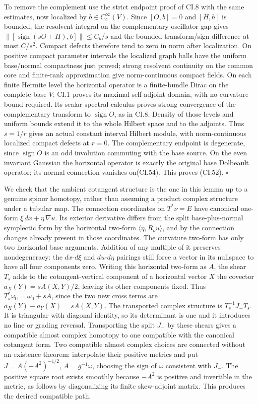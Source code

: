 \documentclass[
  11pt,
]{article}
\begin{document}
To remove the complement use the strict endpoint proof of CI.8 with the
same estimates, now localized by \(b\in C_c^\infty(V)\). Since
\([O,b]=0\) and \([H,b]\) is bounded, the resolvent integral on the
complementary oscillator gap gives
\(\|[\operatorname{sign}(sO+H),b]\|\leq C_b/s\) and the
bounded-transform/sign difference at most \(C/s^2\). Compact defects
therefore tend to zero in norm after localization. On positive compact
parameter intervals the localized graph balls have the uniform
base/normal compactness just proved; strong resolvent continuity on the
common core and finite-rank approximation give norm-continuous compact
fields. On each finite Hermite level the horizontal operator is a
finite-bundle Dirac on the complete base \(V\); CI.1 proves its maximal
self-adjoint domain, with no curvature bound required. Its scalar
spectral calculus proves strong convergence of the complementary
transform to \(\operatorname{sign}O\), as in CI.8. Density of those
levels and uniform bounds extend it to the whole Hilbert space and to
the adjoints. Thus \(s=1/r\) gives an actual constant interval Hilbert
module, with norm-continuous localized compact defects at \(r=0\). The
complementary endpoint is degenerate, since \(\operatorname{sign}O\) is
an odd involution commuting with the base source. On the even invariant
Gaussian the horizontal operator is exactly the original base Dolbeault
operator; its normal connection vanishes on(CI.54). This proves (CI.52).
\(\square\)

We check that the ambient cotangent structure is the one in this lemma
up to a genuine spinor homotopy, rather than assuming a product complex
structure under a tubular map. The connection coordinates on
\(T^*\nu=E\) have canonical one-form \(\xi\,dx+\eta\,\nabla u\). Its
exterior derivative differs from the split base-plus-normal symplectic
form by the horizontal two-form \(\langle\eta,R_\nu u\rangle\), and by
the connection changes already present in those coordinates. The
curvature two-form has only two horizontal base arguments. Addition of
any multiple of it preserves nondegeneracy: the \(dx\)-\(d\xi\) and
\(du\)-\(d\eta\) pairings still force a vector in its nullspace to have
all four components zero. Writing this horizontal two-form as \(A\), the
shear \(T_s\) adds to the cotangent-vertical component of a horizontal
vector \(X\) the covector \(a_X(Y)=sA(X,Y)/2\), leaving its other
components fixed. Thus \(T_s^*\omega_0=\omega_0+sA\), since the two new
cross terms are \(a_X(Y)-a_Y(X)=sA(X,Y)\). The transported complex
structure is \(T_s^{-1}J_-T_s\). It is triangular with diagonal
identity, so its determinant is one and it introduces no line or grading
reversal. Transporting the split \(J_-\) by these shears gives a
compatible almost complex homotopy to one compatible with the canonical
cotangent form. Two compatible almost complex choices are connected
without an existence theorem: interpolate their positive metrics and put
\(J=A(-A^2)^{-1/2}\), \(A=g^{-1}\omega\), choosing the sign of
\(\omega\) consistent with \(J_-\). The positive square root exists
smoothly because \(-A^2\) is positive and invertible in the metric, as
follows by diagonalizing its finite skew-adjoint matrix. This produces
the desired compatible path.
\end{document}
